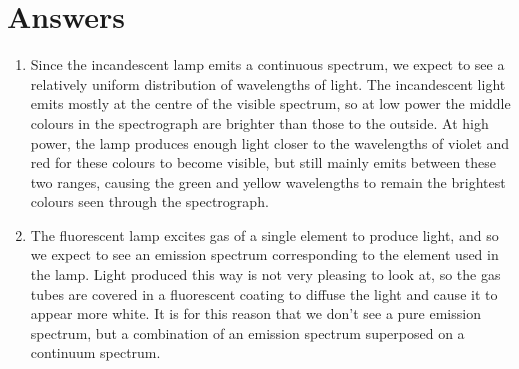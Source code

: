 \documentclass[11pt]{article}
\begin{document}
\section{Answers}
\begin{enumerate}[label={\textbf{\emph{(\arabic*)}}}]

	\item %
Since the incandescent lamp emits a continuous spectrum, we expect to see a relatively uniform distribution of wavelengths of light.
The incandescent light emits mostly at the centre of the visible spectrum, so at low power the middle colours in the spectrograph are brighter than those to the outside.
At high power, the lamp produces enough light closer to the wavelengths of violet and red for these colours to become visible, but still mainly emits between these two ranges, causing the green and yellow wavelengths to remain the brightest colours seen through the spectrograph.

	\item %
The fluorescent lamp excites gas of a single element to produce light, and so we expect to see an emission spectrum corresponding to the element used in the lamp.
Light produced this way is not very pleasing to look at, so the gas tubes are covered in a fluorescent coating to diffuse the light and cause it to appear more white.
It is for this reason that we don't see a pure emission spectrum, but a combination of an emission spectrum superposed on a continuum spectrum.


\end{enumerate}
\end{document}
